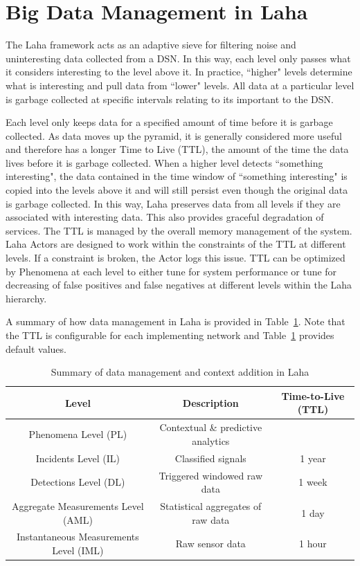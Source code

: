 \section{Big Data Management in Laha} \label{sec:big-data-management}
The Laha framework acts as an adaptive sieve for filtering noise and uninteresting data collected from a DSN. In this way, each level only passes what it considers interesting to the level above it. In practice, ``higher" levels determine what is interesting and pull data from ``lower" levels. All data at a particular level is garbage collected at specific intervals relating to its important to the DSN\@.

Each level only keeps data for a specified amount of time before it is garbage collected. As data moves up the pyramid, it is generally considered more useful and therefore has a longer Time to Live (TTL), the amount of the time the data lives before it is garbage collected.  When a higher level detects ``something interesting", the data contained in the time window of ``something interesting" is copied into the levels above it and will still persist even though the original data is garbage collected. In this way, Laha preserves data from all levels if they are associated with interesting data. This also provides graceful degradation of services. The TTL is managed by the overall memory management of the system. Laha Actors are designed to work within the constraints of the TTL at different levels. If a constraint is broken, the Actor logs this issue. TTL can be optimized by Phenomena at each level to either tune for system performance or tune for decreasing of false positives and false negatives at different levels within the Laha hierarchy.

A summary of how data management in Laha is provided in Table~\ref{data-managament-table}. Note that the TTL is configurable for each implementing network and Table~\ref{data-managament-table} provides default values.

\begin{table}
	\caption{Summary of data management and context addition in Laha}
	\begin{tabular}{|c|c|c|}
		\hline
		Level & Description & Time-to-Live (TTL) \\
		\hline
		Phenomena Level (PL) & Contextual \& predictive analytics &  \\
		\hline
		Incidents Level (IL) & Classified signals &  1 year \\
		\hline
		Detections Level (DL) & Triggered windowed raw data & 1 week  \\
		\hline
		Aggregate Measurements Level (AML) & Statistical aggregates of raw data  & 1 day  \\
		\hline
		Instantaneous Measurements Level (IML) & Raw sensor data  & 1 hour \\
		\hline
	\end{tabular}
    \label{data-managament-table}
\end{table}

